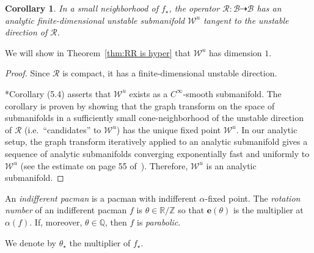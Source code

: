 \documentclass[]{amsart}
\newcommand\RR{\mathcal{R}}
\newcommand{\str}{{\star}}
\newcommand{\ee}{\mathbf e}
\newcommand\WW{\mathcal{W}}
\newcommand\BB{\mathcal{B}}
\newcommand{\Q}{\mathbb{Q}}
\newcommand{\R}{\mathbb{R}}
\newcommand{\Z}{\mathbb{Z}}
\newtheorem{cor}[thm]{Corollary}
\theoremstyle{remark}
\numberwithin{equation}{section}
\theoremstyle{definition}
\begin{document}
\begin{cor}
\label{cor:UnstManExist}
In a small neighborhood of $f_\str$, the operator $\RR\colon \BB\dashrightarrow \BB$ has an analytic finite-dimensional unstable submanifold $\WW^u$ tangent to the unstable direction of $\RR$.
\end{cor}
\noindent We will show in Theorem~\ref{thm:RR is hyper} that $\WW^u$ has dimension $1$.
\begin{proof}
Since $\RR$ is compact, it has a finite-dimensional unstable direction.

\cite{HPS}*{Corollary (5.4)} asserts that $\WW^u$ exists as a $C^\infty$-smooth submanifold. The corollary is proven by showing that the graph transform on the space of submanifolds in a sufficiently small cone-neighborhood of the unstable direction of $\RR$ (i.e.~``candidates'' to $\WW^u$) has the unique fixed point $\WW^u$. In our analytic setup, the graph transform iteratively applied to an analytic submanifold gives a sequence of analytic submanifolds converging exponentially fast and uniformly to $\WW^u$ (see the estimate on page 55 of~\cite{HPS}). Therefore, $\WW^u$ is an analytic submanifold.
\end{proof}




An \emph{indifferent pacman} is a pacman with indifferent $\alpha$-fixed point. The \emph{rotation number} of an indifferent pacman $f$ is $\theta \in \R/\Z$ so that $\ee(\theta)$ is the multiplier at $\alpha(f)$. If, moreover, $\theta\in \Q$, then $f$ is \emph{parabolic}.

We denote by $\theta_\str$  the multiplier of $f_\str$.
\end{document}
